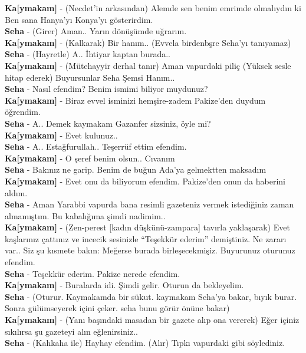 \documentclass[]{book}
\begin{document}
\textbf{Ka{[}ymakam{]}} - (Necdet'in arkasından) Alemde sen benim emrimde olmalıydın ki Ben sana Hanya'yı Konya'yı gösterirdim.\\
\textbf{Seha} - (Girer) Aman.. Yarın dönüşümde uğrarım.\\
\textbf{Ka{[}ymakam{]}} - (Kalkarak) Bir hanım.. (Evvela birdenbşre Seha'yı tanıyamaz)\\
\textbf{Seha} - (Hayretle) A.. İhtiyar kaptan burada..\\
\textbf{Ka{[}ymakam{]}} - (Mütehayyir derhal tanır) Aman vapurdaki piliç (Yüksek sesle hitap ederek) Buyursunlar Seha Şemsi Hanım..\\
\textbf{Seha} - Nasıl efendim? Benim ismimi biliyor muydunuz?\\
\textbf{Ka{[}ymakam{]}} - Biraz evvel isminizi hemşire-zadem Pakize'den duydum öğrendim.\\
\textbf{Seha} - A.. Demek kaymakam Gazanfer sizsiniz, öyle mi?\\
\textbf{Ka{[}ymakam{]}} - Evet kulunuz..\\
\textbf{Seha} - A.. Estağfurullah.. Teşerrüf ettim efendim.\\
\textbf{Ka{[}ymakam{]}} - O şeref benim olsun.. Cıvanım\\
\textbf{Seha} - Bakınız ne garip. Benim de buğun Ada'ya gelmektten maksadım\\
\textbf{Ka{[}ymakam{]}} - Evet onu da biliyorum efendim. Pakize'den onun da haberini aldım.\\
\textbf{Seha} - Aman Yarabbi vapurda bana resimli gazeteniz vermek istediğiniz zaman almamıştım. Bu kabalığıma şimdi nadimim..\\
\textbf{Ka{[}ymakam{]}} - (Zen-perest {[}kadın düşkünü-zampara{]} tavırla yaklaşarak) Evet kaşlarınız çattınız ve incecik sesinizle ``Teşekkür ederim'' demiştiniz. Ne zararı var.. Siz şu kısmete bakın: Meğerse burada birleşecekmişiz. Buyurunuz oturunuz efendim.\\
\textbf{Seha} - Teşekkür ederim. Pakize nerede efendim.\\
\textbf{Ka{[}ymakam{]}} - Buralarda idi. Şimdi gelir. Oturun da bekleyelim.\\
\textbf{Seha} - (Oturur. Kaymakamda bir sükut. kaymakam Seha'ya bakar, bıyık burar. Sonra gülümseyerek içini çeker. seha bunu görür önüne bakar)\\
\textbf{Ka{[}ymakam{]}} - (Yanı başındaki masadan bir gazete alıp ona vererek) Eğer içiniz sıkılırsa şu gazeteyi alın eğlenirsiniz..\\
\textbf{Seha} - (Kahkaha ile) Hayhay efendim. (Alır) Tıpkı vapurdaki gibi söylediniz.\\
\end{document}
